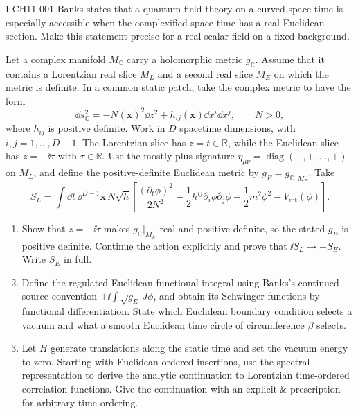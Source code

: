 \begin{exercise}{I-CH11-001}
Banks states that a quantum field theory on a curved space-time is especially
accessible when the complexified space-time has a real Euclidean section.  Make
this statement precise for a real scalar field on a fixed background.

Let a complex manifold $M_{\mathbb C}$ carry a holomorphic metric
$g_{\mathbb C}$.  Assume that it contains a Lorentzian real slice $M_L$ and a
second real slice $M_E$ on which the metric is definite.  In a common static
patch, take the complex metric to have the form
\[
 \dd s_{\mathbb C}^{2}
 =-N(\mathbf x)^2\dd z^2+h_{ij}(\mathbf x)\dd x^i\dd x^j,
 \qquad N>0,
\]
where $h_{ij}$ is positive definite.  Work in $D$ spacetime dimensions, with
$i,j=1,\ldots,D-1$.  The Lorentzian slice has $z=t\in\mathbb R$, while the
Euclidean slice has $z=-\ii\tau$ with $\tau\in\mathbb R$.  Use the mostly-plus
signature $\eta_{\mu\nu}=\operatorname{diag}(-,+,\ldots,+)$ on $M_L$, and
define the positive-definite Euclidean metric by
$g_E=g_{\mathbb C}|_{M_E}$.  Take
\[
 S_L=\int\dd t\,\dd^{D-1}\mathbf x\,N\sqrt h\left[
 \frac{(\partial_t\phi)^2}{2N^2}
 -\frac12h^{ij}\partial_i\phi\partial_j\phi
 -\frac12m^2\phi^2-V_{\mathrm{int}}(\phi)
 \right].
\]

\begin{enumerate}[label=(\alph*)]
 \item Show that $z=-\ii\tau$ makes $g_{\mathbb C}|_{M_E}$ real and
 positive definite, so the stated $g_E$ is positive definite.  Continue the
 action explicitly and prove that
 $\ii S_L\longrightarrow-S_E$.  Write $S_E$ in full.

 \item Define the regulated Euclidean functional integral using Banks's
 continued-source convention $+\ii\int\sqrt{g_E}\,J\phi$, and obtain its
 Schwinger functions by functional differentiation.  State which Euclidean
 boundary condition selects a vacuum and what a smooth Euclidean time circle
 of circumference $\beta$ selects.

 \item Let $H$ generate translations along the static time and set the vacuum
 energy to zero.  Starting with Euclidean-ordered insertions, use the spectral
 representation to derive the analytic continuation to Lorentzian
 time-ordered correlation functions.  Give the continuation with an explicit
 $\ii\epsilon$ prescription for arbitrary time ordering.


\end{enumerate}
\end{exercise}
